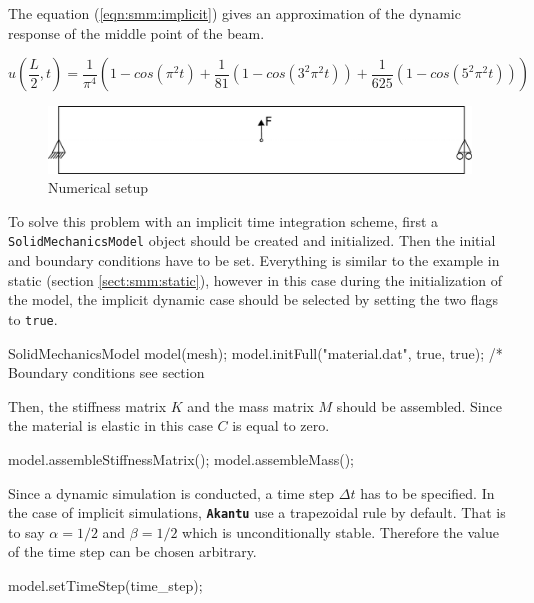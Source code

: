 \documentclass[a4paper,11pt]{book}
\newcommand{\akantu}{\texttt{\textbf{Akantu}}\xspace}
\newcommand{\code}[1]{\texttt{#1}}
\begin{document}
The  equation (\ref{eqn:smm:implicit})  gives  an approximation  of the  dynamic
response of the middle point of the beam.

\begin{equation}\label{eqn:smm:implicit}
  u(\frac{L}{2}, t) = \frac{1}{\pi^4} (1 - cos(\pi^2 t) +
  \frac{1}{81}(1 - cos(3^2 \pi^2 t)) +
  \frac{1}{625}(1 - cos(5^2 \pi^2 t)))
\end{equation}


\begin{figure}[!htb]
  \centering
  \includegraphics[scale=.6]{figures/implicit_dynamic}
  \caption{Numerical setup}
  \label{fig:smm:implicit:dynamic}
\end{figure}

To  solve  this  problem with  an  implicit  time  integration scheme,  first  a
\code{SolidMechanicsModel} object  should be created and  initialized.  Then the
initial and  boundary conditions have to  be set.  Everything is  similar to the
example in  static (section \ref{sect:smm:static}), however in  this case during
the initialization of the model, the implicit dynamic case should be selected by
setting the two flags to \code{true}.

\begin{cpp}[escapechar=\%]
  SolidMechanicsModel model(mesh);
  model.initFull("material.dat", true, true);
  /* Boundary conditions see section %
\end{cpp}

Then,   the  stiffness  matrix   $K$  and   the  mass   matrix  $M$   should  be
assembled.  Since the material is elastic in this case $C$ is equal to zero.
\begin{cpp}
 model.assembleStiffnessMatrix();
 model.assembleMass();
\end{cpp}

Since  a dynamic  simulation is  conducted, a  time step  $\Delta t$  has  to be
specified. In the  case of implicit simulations, \akantu  use a trapezoidal rule
by  default.  That  is to  say  $\alpha  =  1/2$  and  $\beta =  1/2$  which  is
unconditionally  stable. Therefore  the value  of the  time step  can  be chosen
arbitrary.  
\begin{cpp}
  model.setTimeStep(time_step);
\end{cpp}
\end{document}
